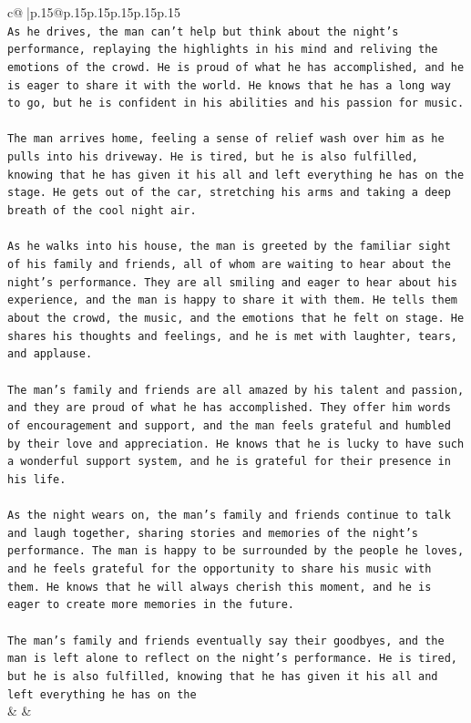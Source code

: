 \documentclass{article}
\begin{document}
{\begin{supertabular}{c@{$\;$}|p{.15\linewidth}@{}p{.15\linewidth}p{.15\linewidth}p{.15\linewidth}p{.15\linewidth}p{.15\linewidth}}
{{{\\ 
\texttt{As he drives, the man can't help but think about the night's performance, replaying the highlights in his mind and reliving the emotions of the crowd. He is proud of what he has accomplished, and he is eager to share it with the world. He knows that he has a long way to go, but he is confident in his abilities and his passion for music.} \\
\\ 
\texttt{The man arrives home, feeling a sense of relief wash over him as he pulls into his driveway. He is tired, but he is also fulfilled, knowing that he has given it his all and left everything he has on the stage. He gets out of the car, stretching his arms and taking a deep breath of the cool night air.} \\
\\ 
\texttt{As he walks into his house, the man is greeted by the familiar sight of his family and friends, all of whom are waiting to hear about the night's performance. They are all smiling and eager to hear about his experience, and the man is happy to share it with them. He tells them about the crowd, the music, and the emotions that he felt on stage. He shares his thoughts and feelings, and he is met with laughter, tears, and applause.} \\
\\ 
\texttt{The man's family and friends are all amazed by his talent and passion, and they are proud of what he has accomplished. They offer him words of encouragement and support, and the man feels grateful and humbled by their love and appreciation. He knows that he is lucky to have such a wonderful support system, and he is grateful for their presence in his life.} \\
\\ 
\texttt{As the night wears on, the man's family and friends continue to talk and laugh together, sharing stories and memories of the night's performance. The man is happy to be surrounded by the people he loves, and he feels grateful for the opportunity to share his music with them. He knows that he will always cherish this moment, and he is eager to create more memories in the future.} \\
\\ 
\texttt{The man's family and friends eventually say their goodbyes, and the man is left alone to reflect on the night's performance. He is tired, but he is also fulfilled, knowing that he has given it his all and left everything he has on the} \\
            }
        }
    }
    & & \\ \\


\end{supertabular}}
\end{document}
